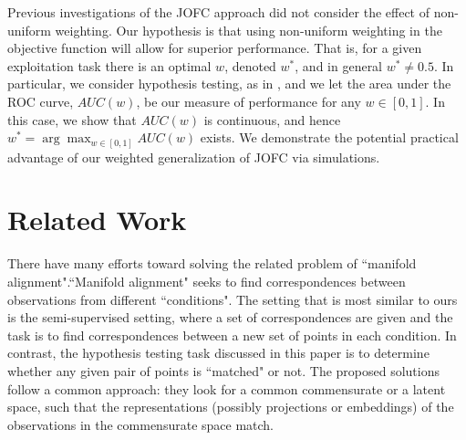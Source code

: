 \documentclass[11pt]{article} %
\begin{document}
 Previous investigations of the JOFC approach \cite{JOFC} did not consider the effect of non-uniform weighting.
Our hypothesis is that using non-uniform weighting  in the objective function will allow for superior performance.
That is, for a given exploitation task there is an optimal $w$, denoted $w^*$, and in general $w^* \neq 0.5$.
In particular, we consider hypothesis testing, as in \cite{JOFC},
and we let the area under the ROC curve, $AUC(w)$, be our measure of performance for any $w \in [0,1]$.
In this case, we show that $AUC(w)$ is continuous, and hence $w^* = \arg\max_{w \in [0,1]} AUC(w)$ exists.
We demonstrate the potential practical advantage of our weighted generalization of JOFC via simulations.


\section{Related Work \label{sec:RelatedWork}}
There have many efforts toward solving the related problem of ``manifold alignment".``Manifold alignment" seeks to find correspondences between observations from different ``conditions". The setting that is most similar to ours is the semi-supervised setting\cite{Ham2005a}, where a set of correspondences are given and the task is to find correspondences between a new set of points in each condition. In contrast, the hypothesis testing task discussed in this paper is to determine whether any given pair of points is ``matched" or not. The proposed solutions\cite{Wang2008,Zhai2010,3wayNMDS}
 follow a common approach: they look for a common commensurate or a latent space, such that the representations (possibly projections or embeddings) of the observations in the commensurate space match.

\end{document}
